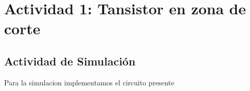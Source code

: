 \section{Actividad 1: Tansistor en zona de corte}

\subsection{Actividad de Simulación}

Para la simulacion implementamos el circuito presente

